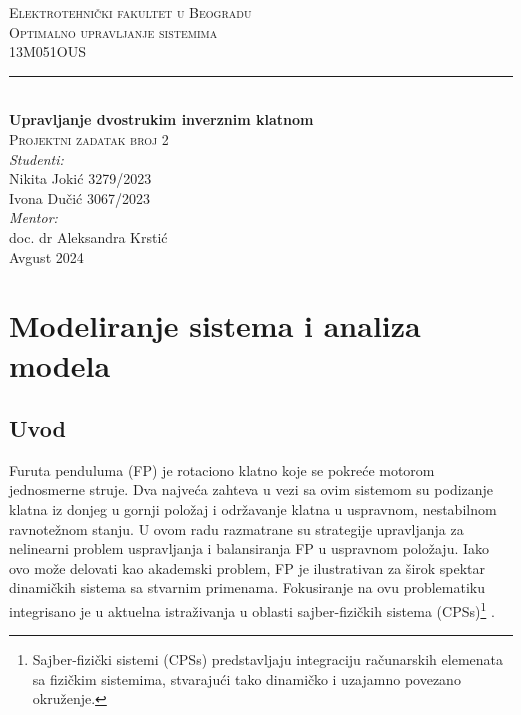 \documentclass[a4paper,11pt]{article}
\theoremstyle{definition} \newtheorem{deff}{Definicija}[section]
\theoremstyle{definition} \newtheorem{prim}[deff]{Primer}
\theoremstyle{plain} \newtheorem{teor}[deff]{Teorema}
\begin{document}
	
	\begin{titlepage}
		
		\newcommand{\HRule}{\rule{\linewidth}{0.5mm}} 							%
		\center 
		
		\textsc{\LARGE Elektrotehnički fakultet u Beogradu}\\[1cm]
		
		\textsc{\Large Optimalno upravljanje sistemima}\\[0.2cm]
		\textsc{\large 13M051OUS}\\[1cm] 										
		\HRule \\[0.8cm]
		{ \huge \bfseries Upravljanje dvostrukim inverznim klatnom}\\[0.7cm]								%
		\textsc{\large Projektni zadatak broj 2}\\[1cm]
		
		
		\large
		\vfill 
		\emph{Studenti:}\\
		Nikita Jokić 3279/2023\\[0.1cm]
		Ivona Dučić 3067/2023\\[1.5cm]		
		\emph{Mentor:}\\
		doc. dr Aleksandra Krstić\\[0.1cm]									
		{\large Avgust 2024}\\[2cm]
	\end{titlepage}
	\tableofcontents
	\newpage
	
	\section{Modeliranje sistema i analiza modela}\label{sec:mod i an}
	\subsection{Uvod} 
	
	Furuta penduluma (FP) je rotaciono klatno koje se pokreće motorom jednosmerne struje. Dva najveća zahteva u vezi sa ovim sistemom su podizanje klatna iz donjeg u gornji položaj i održavanje klatna u uspravnom, nestabilnom ravnotežnom stanju. U ovom radu razmatrane su  strategije upravljanja za nelinearni problem uspravljanja i balansiranja FP u uspravnom  položaju. Iako ovo može delovati kao akademski problem, FP je ilustrativan za širok spektar dinamičkih sistema sa stvarnim primenama. Fokusiranje na ovu problematiku integrisano je u aktuelna istraživanja u oblasti sajber-fizičkih sistema (CPSs)\footnote{Sajber-fizički sistemi (CPSs) predstavljaju integraciju računarskih elemenata sa fizičkim sistemima, stvarajući tako dinamičko i uzajamno povezano okruženje.} \cite{inicijalna}. \\ 
	
\end{document}
